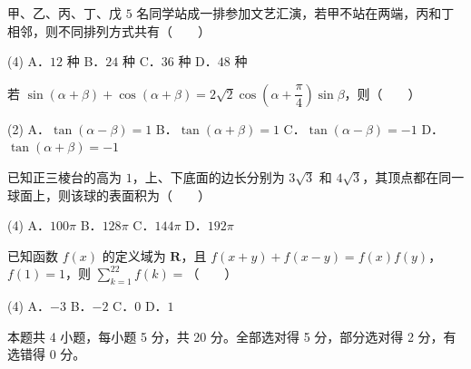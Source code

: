 \begin{question}
甲、乙、丙、丁、戊 $5$ 名同学站成一排参加文艺汇演，若甲不站在两端，丙和丁相邻，则不同排列方式共有\mbox{（　　）}

\begin{gkopts}(4)
\task A．$12$ 种
\task B．$24$ 种
\task C．$36$ 种
\task D．$48$ 种
\end{gkopts}

\end{question}
\begin{question}
若 $\sin(\alpha+\beta)+\cos(\alpha+\beta)=2\sqrt2\cos\left(\alpha+\dfrac\pi4\right)\sin\beta$，则\mbox{（　　）}

\begin{gkopts}(2)
\task A．$\tan(\alpha-\beta)=1$
\task B．$\tan(\alpha+\beta)=1$
\task C．$\tan(\alpha-\beta)=-1$
\task D．$\tan(\alpha+\beta)=-1$
\end{gkopts}

\end{question}
\begin{question}
已知正三棱台的高为 $1$，上、下底面的边长分别为 $3\sqrt3$ 和 $4\sqrt3$，其顶点都在同一球面上，则该球的表面积为\mbox{（　　）}

\begin{gkopts}(4)
\task A．$100\pi$
\task B．$128\pi$
\task C．$144\pi$
\task D．$192\pi$
\end{gkopts}

\end{question}
\begin{question}
已知函数 $f(x)$ 的定义域为 $\mathbf R$，且 $f(x+y)+f(x-y)=f(x)f(y)$，$f(1)=1$，则 $\displaystyle\sum_{k=1}^{22}f(k)=$\mbox{（　　）}

\begin{gkopts}(4)
\task A．$-3$
\task B．$-2$
\task C．$0$
\task D．$1$
\end{gkopts}

\par\medskip

\end{question}

\begin{gktip}
本题共 4 小题，每小题 5 分，共 20 分。全部选对得 5 分，部分选对得 2 分，有选错得 0 分。
\end{gktip}

